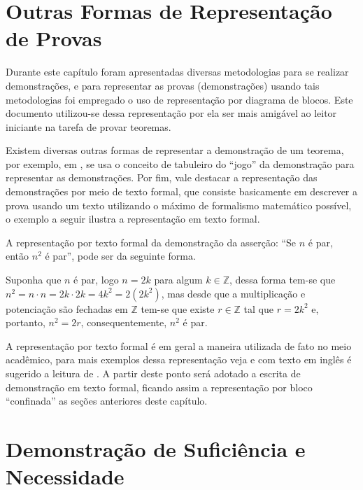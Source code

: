 \section{Outras Formas de Representação de Provas}\label{sec:OutrasFormasProvas}

Durante este capítulo foram apresentadas diversas metodologias para se realizar demonstrações, e para representar as provas (demonstrações) usando tais metodologias foi empregado o uso de representação por diagrama de blocos. Este documento utilizou-se dessa representação por ela ser mais amigável ao leitor iniciante na tarefa de provar teoremas.

Existem diversas outras formas de representar a demonstração de um teorema, por exemplo, em \cite{fmcbook}, se usa o conceito de tabuleiro do ``jogo'' da demonstração para representar as demonstrações. Por fim, vale destacar a representação das demonstrações por meio de texto formal, que consiste basicamente em descrever a prova usando um texto utilizando o máximo de formalismo matemático possível, o exemplo a seguir ilustra a representação em texto formal.

\begin{exemplo}
	A representação por texto formal da demonstração da asserção: ``Se $n$ é par, então $n^2$ é par'', pode ser da seguinte forma.
\end{exemplo}

\begin{prova}
		Suponha que $n$ é par, logo $n = 2k$ para algum $k \in \mathbb{Z}$, dessa forma tem-se que $n^2 = n \cdot n = 2k \cdot 2k = 4k^2 = 2(2k^2)$, mas desde que a multiplicação e potenciação são fechadas em $\mathbb{Z}$ tem-se que existe $r \in \mathbb{Z}$ tal que $r = 2k^2$ e, portanto, $n^2 = 2r$, consequentemente,  $n^2$ é par.
\end{prova}

A representação por texto formal é em geral a maneira utilizada de fato no meio acadêmico, para mais exemplos dessa representação veja \cite{valdi2016master, valdi2020phd, annax2019phd, thadeu2021phd, rui2019phd} e com texto em inglês é sugerido a leitura de \cite{vania2019phd, velleman2019comProvar}. A partir deste ponto será adotado a escrita de demonstração em texto formal, ficando assim a representação por bloco ``confinada'' as seções anteriores deste capítulo.

\section{Demonstração de Suficiência e Necessidade}


